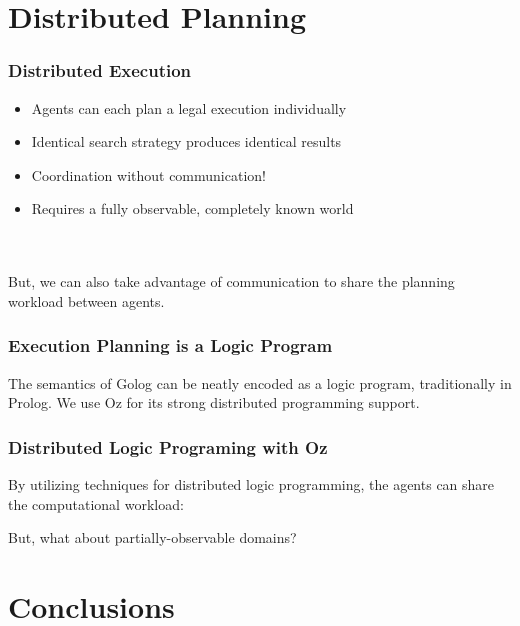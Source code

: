 \documentclass[compress]{beamer}
\begin{document}
\section{Distributed Planning}

\begin{frame}
\frametitle{Distributed Execution}
\begin{itemize}
 \item Agents can each plan a legal execution individually
 \item Identical search strategy produces identical results
 \item Coordination without communication!
 \item Requires a fully observable, completely known world
\end{itemize}
\ \\
\ \\
But, we can also take advantage of communication to share the planning
workload between agents.

\end{frame}

\begin{frame}
\frametitle{Execution Planning is a Logic Program}
The semantics of Golog can be neatly encoded as a logic program,
traditionally in Prolog.  We use Oz for its strong distributed programming
support.

\small 

\end{frame}

\begin{frame}
\frametitle{Distributed Logic Programing with Oz}
By utilizing techniques for distributed logic programming, the agents
can share the computational workload:

\small 

But, what about partially-observable domains?

\end{frame}

\section{Conclusions}
\end{document}
